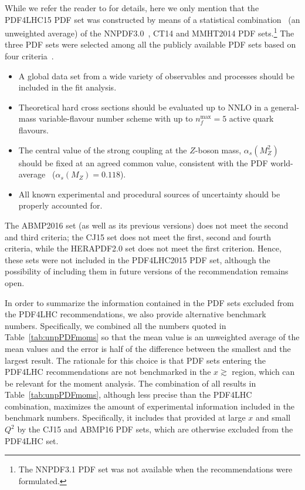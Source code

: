While we refer the reader to \cite{Butterworth:2015oua} for details,
here we only mention that the PDF4LHC15 PDF set was constructed by means of
a statistical combination~\cite{Carrazza:2015hva,Gao:2013bia,Watt:2012tq,
Carrazza:2015aoa} (an unweighted average) of the 
NNPDF3.0~\cite{Ball:2014uwa}, CT14 and MMHT2014 PDF sets.\footnote{The 
NNPDF3.1 PDF set was not available when the recommendations were formulated.}
%
The three PDF sets were selected among all the publicly available PDF sets
based on four criteria~\cite{Butterworth:2015oua}.
%
\begin{itemize}
%
\item A global data set from a wide variety of observables and processes
should be included in the fit analysis.
%
\item Theoretical hard cross sections should be evaluated up to NNLO in a
general-mass variable-flavour number scheme with up to $n_f^\text{max}=5$ 
active quark flavours.
%
\item The central value of the strong coupling at the $Z$-boson mass,
$\alpha_s(M_Z^2)$ should be fixed at an agreed common value, consistent 
with the PDF world-average~\cite{Olive:2016xmw} ($\alpha_s(M_Z)=0.118$).
%
\item All known experimental and procedural sources of uncertainty should be 
properly accounted for.
%
\end{itemize}
%
The ABMP2016 set (as well as its previous versions) does not meet the second 
and third criteria; the CJ15 set does not meet the first, second and fourth
criteria, while the HERAPDF2.0 set does not meet the first criterion.
%
Hence, these sets were not included in the PDF4LHC2015 PDF set, although the 
possibility of including them in future versions of the recommendation 
remains open.

In order to summarize the information contained in the PDF sets excluded from 
the PDF4LHC recommendations, we also provide alternative benchmark numbers.
%
Specifically, we combined all the numbers quoted in Table~\ref{tab:unpPDFmoms}
so that the mean value is an unweighted average of the mean 
values and the error is half of the difference between the smallest and the 
largest result.
%
The rationale for this choice is that PDF sets entering the PDF4LHC 
recommendations are not benchmarked in the $x\gtrsim$ region, which can be 
relevant for the moment analysis.
%
The combination of all results in Table~\ref{tab:unpPDFmoms}, although less
precise than the PDF4LHC combination, maximizes the amount of experimental
information included in the benchmark numbers.
%
Specifically, it includes that provided at large $x$ and small $Q^2$ by the
CJ15 and ABMP16 PDF sets, which are otherwise excluded from the PDF4LHC set.

